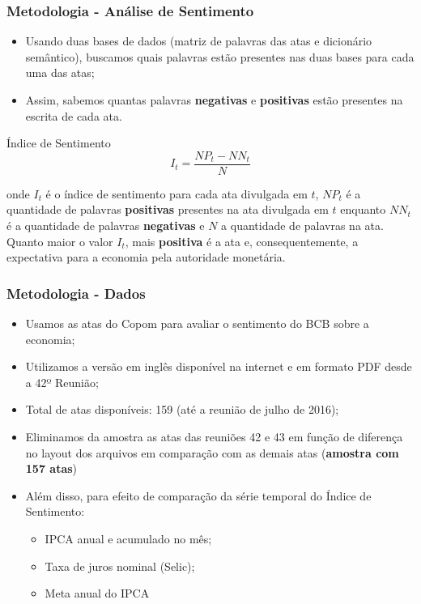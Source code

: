 \documentclass[aspectratio=169]{beamer}
\begin{document}
\begin{frame}\frametitle{Metodologia - Análise de Sentimento}
  \begin{itemize}
    \item Usando duas bases de dados (matriz de palavras das atas e dicionário semântico), buscamos quais palavras estão presentes nas duas bases para cada uma das atas;
    \item Assim, sabemos quantas palavras \textbf{negativas} e \textbf{positivas} estão presentes na escrita de cada ata.
  \end{itemize}
  \begin{exampleblock}{Índice de Sentimento}
\[
{I}_{t} = \frac {{NP}_{t} - {NN}_{t}}{N} 
\]
  \end{exampleblock}
\noindent onde ${I}_{t}$ é o índice de sentimento para cada ata divulgada em $t$, ${NP}_{t}$ é a quantidade de palavras \textbf{positivas} presentes na ata divulgada em $t$ enquanto ${NN}_{t}$ é a quantidade de palavras \textbf{negativas} e $N$ a quantidade de palavras na ata. Quanto maior o valor ${I}_{t}$, mais \textbf{positiva} é a ata e, consequentemente, a expectativa para a economia pela autoridade monetária. 
\end{frame}

\begin{frame}\frametitle{Metodologia - Dados}
  \begin{itemize}
    \item Usamos as atas do Copom para avaliar o sentimento do BCB sobre a economia;
    \item Utilizamos a versão em inglês disponível na internet e em formato PDF desde a 42º Reunião;
    \item Total de atas disponíveis: 159 (até a reunião de julho de 2016);
    \item Eliminamos da amostra as atas das reuniões 42 e 43 em função de diferença no layout dos arquivos em comparação com as demais atas (\textbf{amostra com 157 atas})
    \item Além disso, para efeito de comparação da série temporal do Índice de Sentimento:
    \begin{itemize}
      \item IPCA anual e acumulado no mês;
      \item Taxa de juros nominal (Selic);
      \item Meta anual do IPCA
    \end{itemize}
  \end{itemize}
\end{frame}
\end{document}
